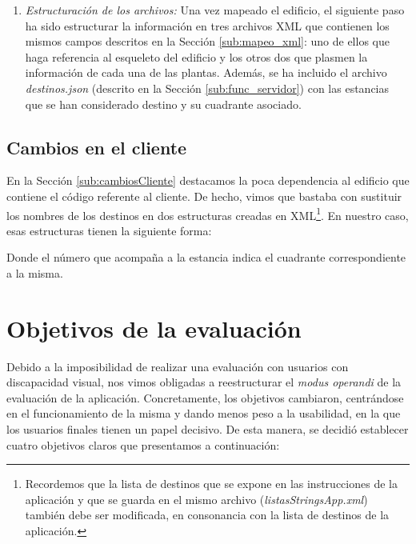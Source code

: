\begin{enumerate}
	\item \textit{Estructuración de los archivos:} Una vez mapeado el edificio, el siguiente paso ha sido estructurar la información en tres archivos XML que contienen los mismos campos descritos en la Sección \ref{sub:mapeo_xml}: uno de ellos que haga referencia al esqueleto del edificio y los otros dos que plasmen la información de cada una de las plantas. Además, se ha incluido el archivo \textit{destinos.json} (descrito en la Sección \ref{sub:func_servidor}) con las estancias que se han considerado destino y su cuadrante asociado.%
\end{enumerate}


\subsection{Cambios en el cliente}
\label{sub:cambiosCliente_vivienda}

En la Sección \ref{sub:cambiosCliente} destacamos la poca dependencia al edificio que contiene el código referente al cliente. De hecho, vimos que bastaba con sustituir los nombres de los destinos en dos estructuras creadas en XML\footnote{Recordemos que la lista de destinos que se expone en las instrucciones de la aplicación y que se guarda en el mismo archivo (\textit{listasStringsApp.xml}) también debe ser modificada, en consonancia con la lista de destinos de la aplicación.}. En nuestro caso, esas estructuras tienen la siguiente forma: 





Donde el número que acompaña a la estancia indica el cuadrante correspondiente a la misma.

\section{Objetivos de la evaluación}
\label{sec:objetivosEval}

Debido a la imposibilidad de realizar una evaluación con usuarios con discapacidad visual, nos vimos obligadas a reestructurar el \textit{modus operandi} de la evaluación de la aplicación. Concretamente, los objetivos cambiaron, centrándose en el funcionamiento de la misma y dando menos peso a la usabilidad, en la que los usuarios finales tienen un papel decisivo. De esta manera, se decidió establecer cuatro objetivos claros que presentamos a continuación:

